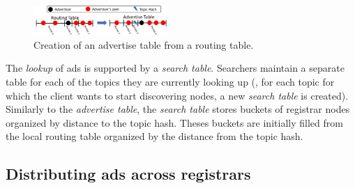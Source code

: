 \begin{figure}
    \includegraphics[width=0.45\textwidth]{img/tables}
    \vspace{-0.05in}
    \caption{Creation of an advertise table from a routing table.} %
    \label{fig:advertise_table}
    \vspace{-0.15in}
 \end{figure}

The \emph{lookup} of ads is supported by a \emph{search table}.
Searchers maintain a separate table for each of the topics they are currently looking up (\ie, for each topic for which the client wants to start discovering nodes, a new \emph{search table} is created). 
Similarly to the \emph{advertise table}, the \emph{search table} stores buckets of registrar nodes organized by distance to the topic hash.
Theses buckets are initially filled from the local routing table organized by the distance from the topic hash. %


\subsection{Distributing ads across registrars}
\label{sec:registration_multi}

